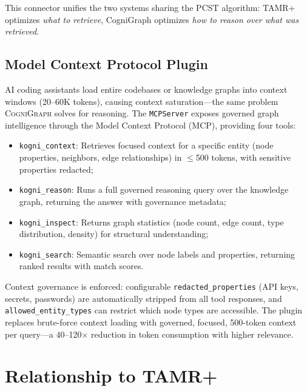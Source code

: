 \documentclass[a4paper,11pt]{article}
\theoremstyle{definition}
\newcommand{\cogni}{\textsc{CogniGraph}}
\begin{document}
This connector unifies the two systems sharing the PCST algorithm: TAMR+ optimizes \textit{what to retrieve}, CogniGraph optimizes \textit{how to reason over what was retrieved}.

\subsection{Model Context Protocol Plugin}
\label{sec:mcp_plugin}

AI coding assistants load entire codebases or knowledge graphs into context windows (20--60K tokens), causing context saturation—the same problem \cogni{} solves for reasoning.
The \texttt{MCPServer} exposes governed graph intelligence through the Model Context Protocol (MCP), providing four tools:

\begin{itemize}
\item \texttt{kogni\_context}: Retrieves focused context for a specific entity (node properties, neighbors, edge relationships) in $\le$500 tokens, with sensitive properties redacted;
\item \texttt{kogni\_reason}: Runs a full governed reasoning query over the knowledge graph, returning the answer with governance metadata;
\item \texttt{kogni\_inspect}: Returns graph statistics (node count, edge count, type distribution, density) for structural understanding;
\item \texttt{kogni\_search}: Semantic search over node labels and properties, returning ranked results with match scores.
\end{itemize}

Context governance is enforced: configurable \texttt{redacted\_properties} (API keys, secrets, passwords) are automatically stripped from all tool responses, and \texttt{allowed\_entity\_types} can restrict which node types are accessible.
The plugin replaces brute-force context loading with governed, focused, 500-token context per query—a 40--120$\times$ reduction in token consumption with higher relevance.

\section{Relationship to TAMR+}
\label{sec:tamr}
\end{document}
